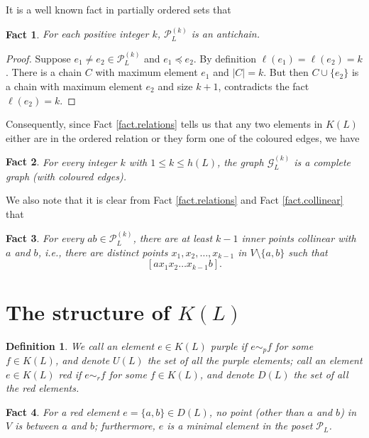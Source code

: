 \documentclass[12pt]{article}
\newtheorem{fact}{Fact}
\newtheorem{defi}{Definition}
\begin{document}
It is a well known fact in partially ordered sets that

\begin{fact}\label{fact.antichain}
For each positive integer $k$, $\mathcal{P}_L^{(k)}$ is an antichain.
\end{fact}

\begin{proof}
Suppose $e_1 \neq e_2 \in \mathcal{P}_L^{(k)}$
and $e_1 \preccurlyeq e_2$.
By definition $\ell(e_1) = \ell(e_2) = k$.
There is a chain $C$ with maximum element $e_1$
and $|C|=k$.
But then $C \cup \{e_2\}$
is a chain with maximum element $e_2$
and size $k+1$, contradicts the fact $\ell(e_2) = k$.
\end{proof}

Consequently, since Fact \ref{fact.relations} tells us
that any two elements in $K(L)$ either are in the ordered relation or they form one of the coloured edges, we have

\begin{fact}\label{fact.complete_on_level}
For every integer $k$ with $1 \le k \le h(L)$,
the graph $\mathcal{G}_L^{(k)}$ is a complete graph (with coloured edges).
\end{fact}

We also note that it is clear from Fact \ref{fact.relations} and Fact \ref{fact.collinear} that

\begin{fact}\label{fact.level_k_inner}
For every $ab \in \mathcal{P}_L^{(k)}$, there are at least $k-1$ inner points collinear with $a$ and $b$,
i.e., there are distinct points $x_1, x_2, \dots, x_{k-1}$ in $V \setminus \{a, b\}$ such that
\[
[a x_1 x_2 \dots x_{k-1} b].
\]
\end{fact}

\section {The structure of $K(L)$}\label{sect.generators}

\begin{defi}
We call an element $e \in K(L)$ purple if 
$e \sim_p f$ for some $f \in K(L)$,
and denote $U(L)$ the set of all the purple elements;
call an element $e \in K(L)$ red if
$e \sim_r f$ for some $f \in K(L)$,
and denote $D(L)$ the set of all the red elements.
\end{defi}

\begin{fact}\label{fact.red_element}
For a red element $e = \{a, b\} \in D(L)$,
no point (other than $a$ and $b$) in $V$ is between $a$ and $b$;
furthermore, $e$ is a minimal element in the poset
$\mathcal{P}_L$.
\end{fact}
\end{document}
